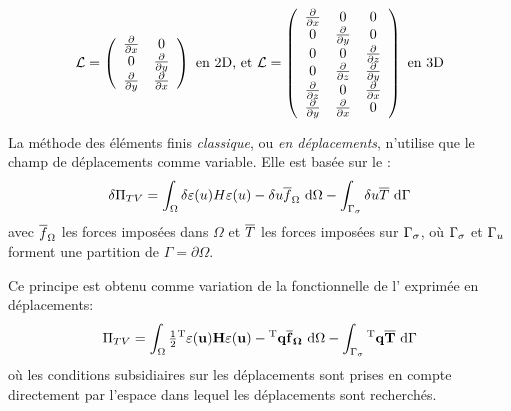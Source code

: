 \begin{equation}
   \mathbf{\mathcal{L}} = \left( 
                 \begin{array}{cc}
                    \tfrac{\partial}{\partial x} & 0\\
                    0 & \tfrac{\partial}{\partial y}\\
                    \tfrac{\partial}{\partial y} &
                    \tfrac{\partial}{\partial x}
                 \end{array}
              \right)
   \text{ en 2D, et }
   \mathbf{\mathcal{L}} = \left( 
                 \begin{array}{ccc}
                    \tfrac{\partial}{\partial x} & 0 & 0\\
                    0 & \tfrac{\partial}{\partial y} & 0\\
                    0 & 0 & \tfrac{\partial}{\partial z}\\
                    0 & \tfrac{\partial}{\partial z} &
                    \tfrac{\partial}{\partial y}\\
                    \tfrac{\partial}{\partial z} & 0&
                    \tfrac{\partial}{\partial x} \\
                    \tfrac{\partial}{\partial y} &
                    \tfrac{\partial}{\partial x} &0\\
                 \end{array}
              \right)
   \text{ en 3D}
\end{equation}

\medskip
La mé{}thode des é{}lé{}ments finis \emph{classique}, ou \emph{en
dé{}placements}, n'utilise que le champ de dé{}placements comme
variable. Elle est basé{}e sur le :
\begin{equation}
   \label{Eq:deltaPiTV}
   \delta\Pi_{TV} = \displaystyle\int_{\Omega} \delta\varepsilon(u)H\varepsilon(u)
           - \delta u\overline{f}_{\Omega} \ \text{d}\Omega
           -\displaystyle\int_{\Gamma_\sigma} \delta u\overline{T} \ \text{d}\Gamma
\end{equation}
avec $\overline{f}_{\Omega}$ les forces imposées dans $\Omega$ et $\overline{T}$ les forces imposées
sur $\Gamma_\sigma$, où $\Gamma_\sigma$ et $\Gamma_u$ forment une partition de
$\Gamma=\partial\Omega$.

\medskip
Ce principe est obtenu comme variation de la fonctionnelle de
l' exprimé{}e en dé{}placements:
\begin{equation}
   \label{Eq:PiTV}
   \Pi_{TV} = \displaystyle\int_{\Omega} \tfrac12 {}^\mathrm{T}\mathbf{\varepsilon(u)}\mathbf{H}\mathbf{\varepsilon(u)}
           - {}^\mathrm{T}\mathbf{q}\mathbf{\overline{f}_{\Omega}} \ \text{d}\Omega
           -\displaystyle\int_{\Gamma_\sigma} {}^\mathrm{T}\mathbf{q}\mathbf{\overline{T}} \ \text{d}\Gamma
\end{equation}
où les conditions subsidiaires sur les dé{}placements sont prises en compte
directement par l'espace dans lequel les déplacements sont recherchés.

